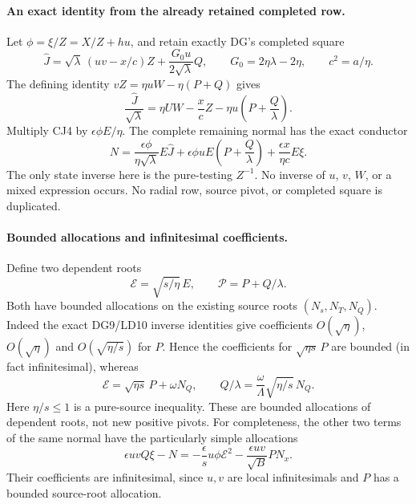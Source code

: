\paragraph{An exact identity from the already retained completed row.}
Let $\phi=\xi/Z=X/Z+hu$, and retain exactly DG's completed square
\[
 \widehat J=\sqrt\lambda\,(uv-x/c)Z
       +\frac{G_0u}{2\sqrt\lambda}Q,
 \qquad G_0=2\eta\lambda-2\eta,\qquad c^2=a/\eta.
\]
The defining identity $vZ=\eta uW-\eta(P+Q)$ gives
\[
 \boxed{\quad
 \frac{\widehat J}{\sqrt\lambda}
 =\eta U W-\frac{x}{c}Z
                -\eta u\left(P+\frac Q\lambda\right).
 \quad}                                                       \tag{CJ4}
\]
Multiply CJ4 by $\epsilon\phi E/\eta$.  The complete remaining
normal has the exact conductor
\[
 \boxed{\quad
 N=\frac{\epsilon\phi}{\eta\sqrt\lambda}E\widehat J
       +\epsilon\phi uE\left(P+\frac Q\lambda\right)
       +\frac{\epsilon x}{\eta c}E\xi .
 \quad}                                                       \tag{CJ5}
\]
The only state inverse here is the pure-testing $Z^{-1}$.  No inverse
of $u$, $v$, $W$, or a mixed expression occurs.  No radial row, source
pivot, or completed square is duplicated.

\paragraph{Bounded allocations and infinitesimal coefficients.}
Define two dependent roots
\[
 \mathcal E=\sqrt{s/\eta}\,E,
 \qquad \mathcal P=P+Q/\lambda.
\]
Both have bounded allocations on the existing source roots
$(N_s,N_T,N_Q)$.  Indeed the exact DG9/LD10 inverse identities give
coefficients $O(\sqrt\eta)$, $O(\sqrt\eta)$ and
$O(\sqrt{\eta/s})$ for $P$.  Hence the coefficients for
$\sqrt{\eta s}\,P$ are bounded (in fact infinitesimal), whereas
\[
 \mathcal E=\sqrt{\eta s}\,P+\omega N_Q,
 \qquad
 Q/\lambda=\frac{\omega}{\Lambda}\sqrt{\eta/s}\,N_Q.
                                                               \tag{CJ6}
\]
Here $\eta/s\le1$ is a pure-source inequality.  These are bounded
allocations of dependent roots, not new positive pivots.
For completeness, the other two terms of the same normal have
the particularly simple allocations
\[
 \epsilon uvQ\xi-N
   =-\frac{\epsilon}{s}u\phi\mathcal E^2
     -\frac{\epsilon uv}{\sqrt B}PN_x.               \tag{CJ6a}
\]
Their coefficients are infinitesimal, since $u,v$ are local
infinitesimals and $P$ has a bounded source-root allocation.

